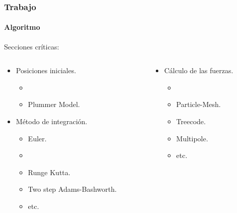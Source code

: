 \frame
{
\frametitle{Trabajo}
\framesubtitle{Algoritmo}
Secciones críticas:
\begin{columns}
    \begin{column}{0.5\textwidth}
        \begin{itemize}
            \item Posiciones iniciales.
            \begin{itemize}
                \item {}
                \item Plummer Model.
            \end{itemize}
            \item Método de integración.
            \begin{itemize}
                \item Euler.
                \item {}
                \item Runge Kutta.
                \item Two step Adams-Bashworth.
                \item etc.
            \end{itemize}
        \end{itemize}
    \end{column}
    \begin{column}{0.5\textwidth}
        \begin{itemize}
            \item Cálculo de las fuerzas.
            \begin{itemize}
                \item {} 
                \item Particle-Mesh.  
                \item Treecode. 
                \item Multipole. 
                \item etc.
            \end{itemize}
        \end{itemize}
    \end{column}
\end{columns}
}


